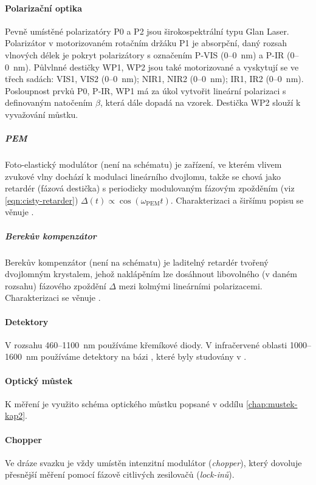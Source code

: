 \paragraph{Polarizační optika}
Pevně umístěné polarizatóry P0 a P2 jsou širokospektrální typu Glan Laser.
Polarizátor v motorizovaném rotačním držáku P1 je absorpční, daný rozsah vlnových délek je pokryt polarizátory s označením P-VIS (\num{0}--\SI{0}{\nano\meter}) a P-IR (\num{0}--\SI{0}{\nano\meter}).
Půlvlnné destičky WP1, WP2 jsou také motorizované a vyskytují se ve třech sadách: VIS1, VIS2 (\num{0}--\SI{0}{\nano\meter}); NIR1, NIR2 (\num{0}--\SI{0}{\nano\meter}); IR1, IR2 (\num{0}--\SI{0}{\nano\meter}).
Posloupnost prvků P0, P-IR, WP1 má za úkol vytvořit lineární polarizaci s definovaným natočením $\beta$, která dále dopadá na vzorek.
Destička WP2 slouží k vyvažování můstku.

\subparagraph{PEM}
Foto-elastický modulátor (není na schématu) je zařízení, ve kterém vlivem zvukové vlny dochází k modulaci lineárního dvojlomu,
takže se chová jako retardér (fázová destička) s periodicky modulovaným fázovým zpožděním (viz \eqref{eqn:cisty-retarder}) $\Delta(t) \propto \cos(\omega_\textrm{PEM}t)$. 
Charakterizaci a širšímu popisu se věnuje \cite{minarModulacePolarizaceSvetelne2004}.

\subparagraph{Berekův kompenzátor}
Berekův kompenzátor (není na schématu) je laditelný retardér tvořený dvojlomným krystalem, jehož naklápěním lze dosáhnout libovolného (v daném rozsahu) fázového zpoždění $\Delta$ mezi kolmými lineárními polarizacemi.
Charakterizaci se věnuje \cite{schusserSkryteKouzloPolarizace2014}.

\paragraph{Detektory}
V rozsahu \num{460}--\SI{1100}{\nano\meter} používáme křemíkové diody.
V infračervené oblasti \num{1000}--\SI{1600}{\nano\meter} používáme detektory na bázi , které byly studovány v \cite{hovorakovaCharakterizaceInfracervenehoDetektoru}.

\paragraph{Optický můstek}
K měření je využito schéma optického můstku popsané v oddílu \ref{chap:mustek-kap2}.

\paragraph{Chopper}
Ve dráze svazku je vždy umístěn intenzitní modulátor (\emph{chopper}), který dovoluje přesnější měření pomocí fázově citlivých zesilovačů (\emph{lock-inů}).

